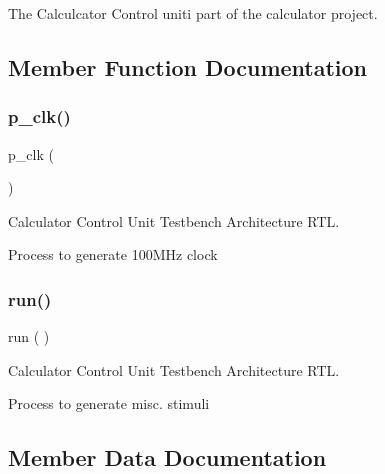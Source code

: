 The Calculcator Control uniti part of the calculator project. 

\subsection{Member Function Documentation}
\mbox{\label{classtb__calc__ctrl_1_1sim_af35c81fcf5e4601a4e5d669b422cf79a}} 
\subsubsection{\texorpdfstring{p\+\_\+clk()}{p\_clk()}}
{\footnotesize\ttfamily p\+\_\+clk (\begin{DoxyParamCaption}{ }\end{DoxyParamCaption})}



Calculator Control Unit Testbench Architecture R\+TL. 

Process to generate 100\+M\+Hz clock \mbox{\label{classtb__calc__ctrl_1_1sim_a0f40b896b2461e250ebafd4e27b8ff54}} 
\subsubsection{\texorpdfstring{run()}{run()}}
{\footnotesize\ttfamily  {\bfseries \textcolor{vhdlchar}{ }} run ( ) \hspace{0.3cm}{\ttfamily [Process]}}



Calculator Control Unit Testbench Architecture R\+TL. 

Process to generate misc. stimuli 

\subsection{Member Data Documentation}
\mbox{\label{classtb__calc__ctrl_1_1sim_a107e48c926f0bc80ef4d44886a9244be}} 
